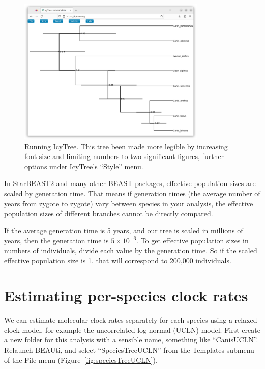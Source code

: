 \documentclass[12pt]{article}
\begin{document}
\begin{figure}[htb!]
\centering
\includegraphics[width=0.8\textwidth]{figures/icytree.png}
\caption
{Running IcyTree. This tree been made more legible by increasing font size and limiting numbers to two significant figures, further options under IcyTree's ``Style'' menu.}
\label{fig:icytree}
\end{figure}

In StarBEAST2 and many other BEAST packages, effective population sizes are
scaled by generation time. That means if generation times (the average
number of years from zygote to zygote) vary between species in your
analysis, the effective population sizes of different branches cannot be
directly compared.

If the average generation time is 5 years, and our tree is scaled in millions
of years, then the generation time is $5\times10^{-6}$. To get effective
population sizes in numbers of individuals, divide each value by the
generation time. So if the scaled effective population size is 1, that
will correspond to 200,000 individuals.{}

\section{Estimating per-species clock rates}
\label{sec:relaxedClock}

We can estimate molecular clock rates separately for each species using
a relaxed clock model, for example the uncorrelated log-normal (UCLN) model.
First create a new folder for this analysis with a sensible name, something
like ``CanisUCLN''. Relaunch BEAUti, and select ``SpeciesTreeUCLN'' from the
Templates submenu of the File menu (Figure~\ref{fig:speciesTreeUCLN}).
\end{document}
